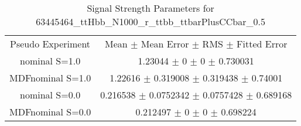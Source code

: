 \begin{table}
\centering
\caption{Signal Strength Parameters for 63445464\_ttHbb\_N1000\_r\_ttbb\_ttbarPlusCCbar\_0.5}
\begin{tabular}{cc}
\toprule
Pseudo Experiment & Mean $\pm$ Mean Error $\pm$ RMS $\pm$ Fitted Error\\
nominal S=1.0 & \num{1.23044} $\pm$ \num{0} $\pm$ \num{0} $\pm$ \num{0.730031}\\
MDFnominal S=1.0 & \num{1.22616} $\pm$ \num{0.319008} $\pm$ \num{0.319438} $\pm$ \num{0.74001}\\
nominal S=0.0 & \num{0.216538} $\pm$ \num{0.0752342} $\pm$ \num{0.0757428} $\pm$ \num{0.689168}\\
MDFnominal S=0.0 & \num{0.212497} $\pm$ \num{0} $\pm$ \num{0} $\pm$ \num{0.698224}\\
\bottomrule
\end{tabular}
\end{table}